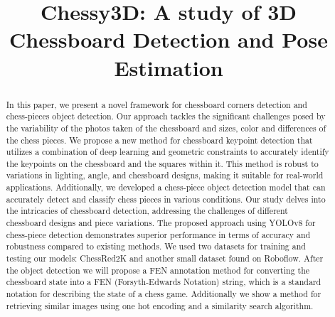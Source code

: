 \documentclass[conference]{IEEEtran}
\begin{document}
\title{Chessy3D: A study of 3D Chessboard Detection and Pose Estimation\\}

\author{
\and
\and
}

\maketitle

\begin{abstract}
In this paper, we present a novel framework for chessboard corners detection
 and chess-pieces object detection. 
Our approach tackles the significant challenges posed by the variability
 of the photos taken of the chessboard and sizes, color and differences of the chess pieces.
We propose a new method for chessboard keypoint detection that utilizes a combination of
 deep learning and geometric constraints to accurately identify the keypoints on the chessboard
 and the squares within it.
This method is robust to variations in lighting, angle, and chessboard designs,
making it suitable for real-world applications.
Additionally, we developed a chess-piece object detection model that can accurately detect and classify chess pieces in various conditions.
Our study delves into the intricacies of chessboard detection, addressing the challenges of different chessboard designs and piece variations.
The proposed approach using YOLOv8 for chess-piece detection
 demonstrates superior performance in terms of accuracy and robustness compared to existing methods.
We used two datasets for training and testing our models: ChessRed2K and another small dataset found on Roboflow.
After the object detection we will propose a FEN annotation method for converting the chessboard state into a
 FEN (Forsyth-Edwards Notation) string, which is a standard notation for describing the state of a chess game.
Additionally we show a method for retrieving similar images using one hot encoding
 and a similarity search algorithm.
\end{abstract}
\end{document}
